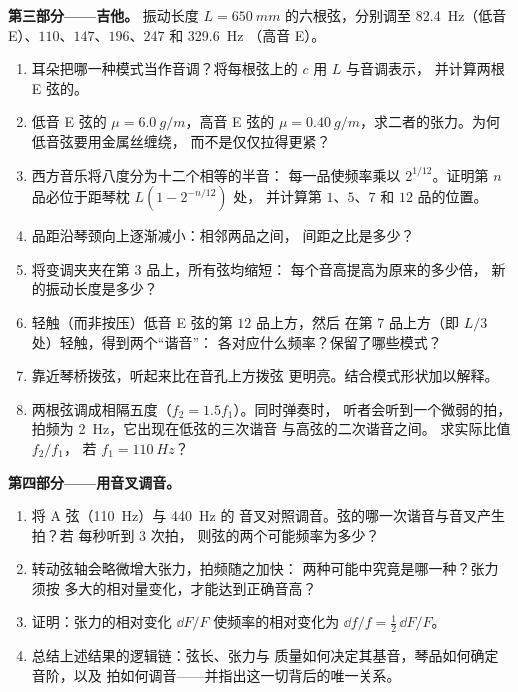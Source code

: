 \begin{problem}
\medskip
\noindent\textbf{第三部分——吉他。}
振动长度 $L = \qty{650}{mm}$ 的六根弦，分别调至
\qty{82.4}{Hz}（低音 E）、$110$、$147$、$196$、$247$ 和 \qty{329.6}{Hz}
（高音 E）。
\begin{enumerate}[resume]
  \item 耳朵把哪一种模式当作音调？将每根弦上的 $c$ 用 $L$ 与音调表示，
        并计算两根 E 弦的。
  \item 低音 E 弦的 $\mu = \qty{6.0}{g/m}$，高音 E 弦的
        $\mu = \qty{0.40}{g/m}$，求二者的张力。为何低音弦要用金属丝缠绕，
        而不是仅仅拉得更紧？
  \item 西方音乐将八度分为十二个相等的半音：
        每一品使频率乘以 $2^{1/12}$。证明第
        $n$ 品必位于距琴枕 $L(1 - 2^{-n/12})$ 处，
        并计算第 $1$、$5$、$7$ 和 $12$ 品的位置。
  \item 品距沿琴颈向上逐渐减小：相邻两品之间，
        间距之比是多少？
  \item 将变调夹夹在第 $3$ 品上，所有弦均缩短：
        每个音高提高为原来的多少倍，
        新的振动长度是多少？
  \item 轻触（而非按压）低音 E 弦的第 $12$ 品上方，然后
        在第 $7$ 品上方（即 $L/3$ 处）轻触，得到两个“谐音”：
        各对应什么频率？保留了哪些模式？
  \item 靠近琴桥拨弦，听起来比在音孔上方拨弦
        更明亮。结合模式形状加以解释。
  \item 两根弦调成相隔五度（$f_2 = 1.5f_1$）。同时弹奏时，
        听者会听到一个微弱的拍，拍频为 \qty{2}{Hz}，它出现在低弦的三次谐音
        与高弦的二次谐音之间。
        求实际比值 $f_2/f_1$，
        若 $f_1 = \qty{110}{Hz}$？
\end{enumerate}

\medskip
\noindent\textbf{第四部分——用音叉调音。}
\begin{enumerate}[resume]
  \item 将 A 弦（\qty{110}{Hz}）与 \qty{440}{Hz} 的
        音叉对照调音。弦的哪一次谐音与音叉产生拍？若
        每秒听到 \qty{3}{} 次拍，
        则弦的两个可能频率为多少？
  \item 转动弦轴会略微增大张力，拍频随之加快：
        两种可能中究竟是哪一种？张力须按
        多大的相对量变化，才能达到正确音高？
  \item 证明：张力的相对变化 $\dd F/F$ 使频率的相对变化为
        $\dd f/f = \tfrac12\,\dd F/F$。
  \item 总结上述结果的逻辑链：弦长、张力与
        质量如何决定其基音，琴品如何确定音阶，以及
        拍如何调音——并指出这一切背后的唯一关系。
\end{enumerate}
\end{problem}
